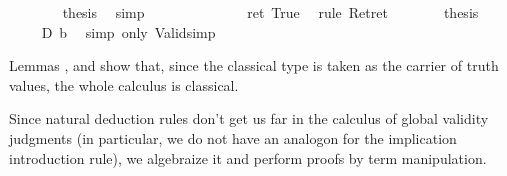 \begin{isabellebody}
\ \ \ \ \ \ \isamarkupfalse%
\ {\isacharquery}thesis\ \isamarkupfalse%
\ simp\isanewline
\ \ \ \ \isamarkupfalse%
\isanewline
\ \ \ \ \isamarkupfalse%
\ \isamarkupfalse%
\ {\isachardoublequote}{\isasymdots}\ {\isacharequal}\ ret\ True{\isachardoublequote}\ \isamarkupfalse%
\ {\isacharparenleft}rule\ Ret{\isacharunderscore}ret{\isacharparenright}\isanewline
\ \ \ \ \isamarkupfalse%
\ \isamarkupfalse%
\ {\isacharquery}thesis\ \isamarkupfalse%
\isacommand{{\isachardot}}\isanewline
\ \ \isamarkupfalse%
\isanewline
\ \ \isamarkupfalse%
\ {\isachardoublequote}{\isasymturnstile}\ {\isasymnot}\isactrlsub D\ b{\isachardoublequote}\ \isamarkupfalse%
\ {\isacharparenleft}simp\ only{\isacharcolon}\ Valid{\isacharunderscore}simp{\isacharparenright}\isanewline
\isamarkupfalse%
\isamarkupfalse%
%
\begin{isamarkuptext}%
Lemmas ,  
  and  show that, since the classical type  
  is taken as the carrier of truth values, the whole calculus is classical.%
\end{isamarkuptext}%
\isamarkuptrue%
%
\isamarkuptrue%
%
\begin{isamarkuptext}%
Since natural deduction rules don't get us far in the calculus of global
  validity judgments (in particular, we do not have an analogon for
  the implication introduction rule), we algebraize it and perform
  proofs by term manipulation.
 

\end{isamarkuptext}
\end{isabellebody}
